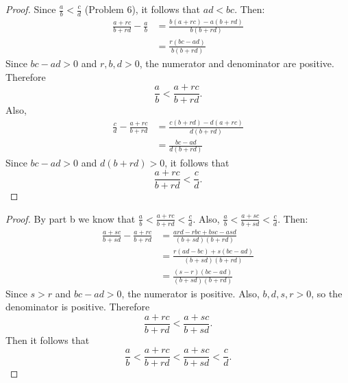 \begin{proof}
    Since $\tfrac{a}{b} < \tfrac{c}{d}$ (Problem 6), it follows that $ad < bc$.  
    Then:
    \begin{align*}
        \frac{a+rc}{b+rd} - \frac{a}{b}
        &= \frac{b(a+rc) - a(b+rd)}{b(b+rd)} \\
        &= \frac{r(bc - ad)}{b(b + rd)}
    \end{align*}
    Since $bc - ad > 0$ and $r,b,d > 0$, the numerator and denominator are positive.  
    Therefore
    \[
        \frac{a}{b} < \frac{a+rc}{b+rd}.
    \]
    Also,
    \begin{align*}
        \frac{c}{d} - \frac{a+rc}{b+rd} 
        &= \frac{c(b + rd) - d(a + rc)}{d(b + rd)} \\
        &= \frac{bc - ad}{d(b + rd)}
    \end{align*}
    Since $bc - ad > 0$ and $d(b+rd) > 0$, it follows that
    \[
        \frac{a+rc}{b+rd} < \frac{c}{d}.
    \]
\end{proof}

\begin{proof}
    By part b we know that $\frac{a}{b} < \frac{a+rc}{b+rd} < \frac{c}{d}$.
    Also, $\frac{a}{b} < \frac{a+sc}{b+sd} < \frac{c}{d}$.
    Then:
    \begin{align*}
        \frac{a + sc}{b + sd} - \frac{a + rc}{b + rd}
        &= \frac{ard - rbc + bsc - asd}{(b + sd)(b + rd)} \\
        &= \frac{r(ad - bc) + s(bc - ad)}{(b + sd)(b + rd)} \\
        &= \frac{(s - r)(bc - ad)}{(b + sd)(b + rd)}
    \end{align*}
    Since $s>r$ and $bc - ad > 0$, the numerator is positive.  
    Also, $b, d, s, r > 0$, so the denominator is positive.  
    Therefore
    \[
        \frac{a + rc}{b + rd} < \frac{a + sc}{b + sd}.
    \]
    Then it follows that
    \[
        \frac{a}{b} < \frac{a + rc}{b + rd} < \frac{a + sc}{b + sd} < \frac{c}{d}.
    \]
\end{proof}